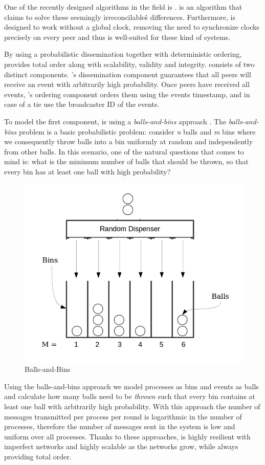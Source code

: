 One of the recently designed algorithms in the field is \epto \autocite{matos2015epto}. \epto is an algorithm that claims to solve these seemingly irreconcilableŝ
differences. Furthermore, \epto is designed to work without a global clock, removing the need to synchronize clocks precisely on every peer and thus is well-suited for these kind of systems.
\par
By using a probabilistic dissemination together with deterministic ordering, \epto provides total order along with scalability, validity and integrity. \epto consists of two distinct components. \epto's dissemination component guarantees that all peers will receive an event with arbitrarily high probability. Once peers have received all events, \epto's ordering component orders them using the events timestamp, and in case of a tie use the broadcaster ID of the events.
\par
To model the first component, \epto is using a \textit{balls-and-bins} approach \autocite{Koldehofe02simplegossiping}. The \textit{balls-and-bins} problem is a basic probabilistic problem: consider \textit{n} balls and \textit{m} bins where we consequently throw balls into a bin uniformly at random and independently from other balls. In this scenario, one of the natural questions that comes to mind is: what is the minimum number of balls that should be thrown, so that every bin has at least one ball with high probability?
\begin{figure}
	\includegraphics[width=\linewidth]{figures/BnB.jpeg}
	\caption[Caption]{Balls-and-Bins\footnotemark}
	\label{fig:balls-and-bins}
\end{figure}
\par
Using the balls-and-bins approach we model processes as bins and events as balls and calculate how many balls need to be \textit{thrown} such that every bin contains at least one ball with arbitrarily high probability. With this approach the number of messages transmitted per process per round is logarithmic in the number of processes, therefore the number of messages sent in the system is low and uniform over all processes. Thanks to these approaches, \epto is highly resilient with  imperfect networks and highly scalable as the networks grow, while always providing total order.
